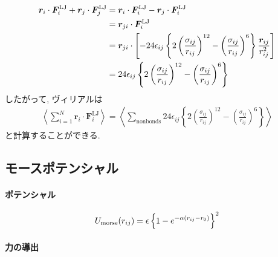 \begin{align}
    \bm{r}_{i} \cdot \bm{F}_{i}^{\mathrm{LJ}}
   +\bm{r}_{j} \cdot \bm{F}_{j}^{\mathrm{LJ}}
 &=
    \bm{r}_{i} \cdot \bm{F}_{i}^{\mathrm{LJ}}
   -\bm{r}_{j} \cdot \bm{F}_{i}^{\mathrm{LJ}}
 \notag
 \\
 &=
    \bm{r}_{ji} \cdot \bm{F}_{i}^{\mathrm{LJ}}
 \notag
 \\
 &=
    \bm{r}_{ji} \cdot
    \left[
          -24\epsilon_{ij}
          \left\{
                  2\left( \frac{\sigma_{ij}}{r_{ij}} \right)^{12}
                  -\left( \frac{\sigma_{ij}}{r_{ij}} \right)^{6}
          \right\}
          \frac{\bm{r}_{ij}}{r_{ij}^{2}}
    \right]
 \notag
 \\
 &=
     24\epsilon_{ij}
     \left\{
            2\left( \frac{\sigma_{ij}}{r_{ij}} \right)^{12}
            -\left( \frac{\sigma_{ij}}{r_{ij}} \right)^{6}
     \right\}
 \notag
\end{align}
したがって, ヴィリアルは
\begin{align}
   \left\langle
        \sum_{i=1}^{N} \bm{r}_{i} \cdot \bm{F}_{i}^{\mathrm{LJ}}
   \right\rangle
 =
   \left\langle
        \sum_{\mathrm{nonbonds}}24\epsilon_{ij}
        \left\{
               2\left( \frac{\sigma_{ij}}{r_{ij}} \right)^{12}
               -\left( \frac{\sigma_{ij}}{r_{ij}} \right)^{6}
        \right\}
   \right\rangle
\end{align}
と計算することができる.
\clearpage


\subsection{モースポテンシャル}
\paragraph{ポテンシャル}

\begin{equation}
   U_{\mathrm{morse}} (r_{ij})
   =
   \epsilon
   \left\{
      1 - e^{-\alpha(r_{ij} - r_{0})}
   \right\}^{2}
   \notag
\end{equation}

\paragraph{力の導出}

